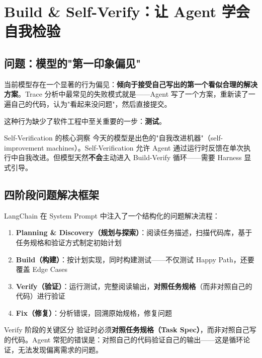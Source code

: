 \section{Build \& Self-Verify：让 Agent 学会自我检验}

\subsection{问题：模型的"第一印象偏见"}

当前模型存在一个显著的行为偏见：\textbf{倾向于接受自己写出的第一个看似合理的解决方案}。Trace 分析中最常见的失败模式就是——Agent 写了一个方案，重新读了一遍自己的代码，认为"看起来没问题"，然后直接提交。

这种行为缺少了软件工程中至关重要的一步：\textbf{测试}。

\begin{importantbox}{Self-Verification 的核心洞察}
今天的模型是出色的"自我改进机器"（self-improvement machines）。Self-Verification 允许 Agent 通过运行时反馈在单次执行中自我改进。但模型天然\textbf{不会}主动进入 Build-Verify 循环——需要 Harness 显式引导。
\end{importantbox}

\subsection{四阶段问题解决框架}

LangChain 在 System Prompt 中注入了一个结构化的问题解决流程：

\begin{enumerate}[leftmargin=2em]
    \item \textbf{Planning \& Discovery（规划与探索）}：阅读任务描述，扫描代码库，基于任务规格和验证方式制定初始计划
    \item \textbf{Build（构建）}：按计划实现，同时构建测试——不仅测试 Happy Path，还要覆盖 Edge Cases
    \item \textbf{Verify（验证）}：运行测试，完整阅读输出，\textbf{对照任务规格}（而非对照自己的代码）进行验证
    \item \textbf{Fix（修复）}：分析错误，回溯原始规格，修复问题
\end{enumerate}

\begin{warningbox}{Verify 阶段的关键区分}
验证时必须\textbf{对照任务规格（Task Spec）}，而非对照自己写的代码。Agent 常犯的错误是：对照自己的代码验证自己的输出——这是循环论证，无法发现偏离需求的问题。
\end{warningbox}

